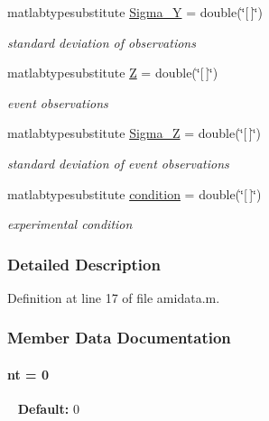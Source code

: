 \begin{DoxyCompactItemize}
matlabtypesubstitute \hyperlink{classamidata_a4bd82fb17b03a0039c2f0347ec8dc393}{Sigma\+\_\+\+Y} = double(\char`\"{}\mbox{[}$\,$\mbox{]}\char`\"{})
\begin{DoxyCompactList}\small\item\em standard deviation of observations \end{DoxyCompactList}\item 
matlabtypesubstitute \hyperlink{classamidata_adc18d83abfd9f87d396e8fd6b6ac0fe1}{Z} = double(\char`\"{}\mbox{[}$\,$\mbox{]}\char`\"{})
\begin{DoxyCompactList}\small\item\em event observations \end{DoxyCompactList}\item 
matlabtypesubstitute \hyperlink{classamidata_a77b1f0ddcfbfb895b17d62a414d35673}{Sigma\+\_\+\+Z} = double(\char`\"{}\mbox{[}$\,$\mbox{]}\char`\"{})
\begin{DoxyCompactList}\small\item\em standard deviation of event observations \end{DoxyCompactList}\item 
matlabtypesubstitute \hyperlink{classamidata_a4824b91cc0e6b5f112bdd8049af4d7d6}{condition} = double(\char`\"{}\mbox{[}$\,$\mbox{]}\char`\"{})
\begin{DoxyCompactList}\small\item\em experimental condition \end{DoxyCompactList}\end{DoxyCompactItemize}


\subsubsection{Detailed Description}


Definition at line 17 of file amidata.\+m.



\subsubsection{Member Data Documentation}
\hypertarget{classamidata_a03cfcdd983bff4aef77268b785b28345}{}
\paragraph[{nt}]{\setlength{\rightskip}{0pt plus 5cm}nt = 0}\label{classamidata_a03cfcdd983bff4aef77268b785b28345}
~\newline
{\bfseries Default\+:} 0

